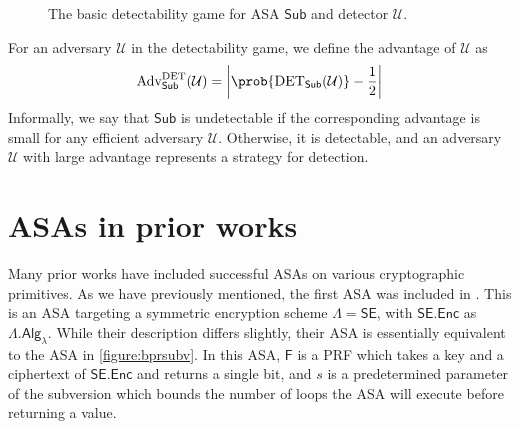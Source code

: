 \begin{figure}
\centering
\begin{pchstack}
\pchspace
{}
\end{pchstack}
\caption[The basic detectability game]{The basic detectability game for ASA $\mathsf{Sub}$ and detector $\mathcal{U}$.}
\label{game:detect}
\end{figure}

For an adversary $\mathcal{U}$ in the detectability game, we define the advantage of $\mathcal{U}$ as
\[
\text{Adv}^\mathrm{DET}_\mathsf{Sub}(\mathcal{U})=\left\lvert \prob{\text{DET}_\mathsf{Sub}(\mathcal{U})}-\frac{1}{2} \right\rvert
\]
Informally, we say that $\mathsf{Sub}$ is undetectable if the corresponding advantage is small for any efficient adversary $\mathcal{U}$. Otherwise, it is detectable, and an adversary $\mathcal{U}$ with large advantage represents a strategy for detection.

\section{ASAs in prior works}

Many prior works have included successful ASAs on various cryptographic primitives. As we have previously mentioned, the first ASA was included in \cite{C:BelPatRog14}. This is an ASA targeting a symmetric encryption scheme $\mathsf{\Lambda}=\mathsf{SE}$, with $\mathsf{SE.Enc}$ as $\mathsf{\Lambda.Alg}_\lambda$. While their description differs slightly, their ASA is essentially equivalent to the ASA in \autoref{figure:bprsubv}. In this ASA, $\mathsf{F}$ is a PRF which takes a key and a ciphertext of $\mathsf{SE.Enc}$ and returns a single bit, and $s$ is a predetermined parameter of the subversion which bounds the number of loops the ASA will execute before returning a value.

